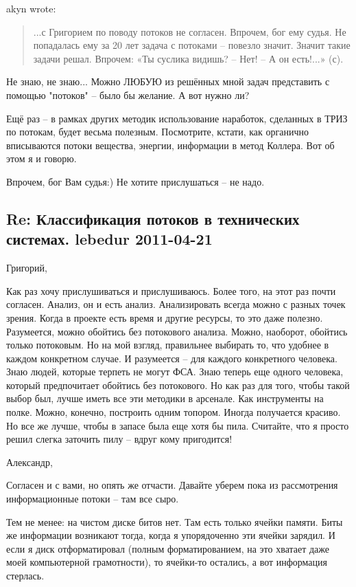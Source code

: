 \documentclass[a4paper,11pt]{article}
\begin{document}
akyn wrote:
\begin{quote}
  ...с Григорием по поводу потоков не согласен. Впрочем, бог ему судья. Не
  попадалась ему за 20 лет задача с потоками – повезло значит. Значит такие
  задачи решал. Впрочем: «Ты суслика видишь? – Нет! – А он есть!...» (с).
\end{quote}
Не знаю, не знаю...  Можно ЛЮБУЮ из решённых мной задач представить с помощью
"потоков" {--} было бы желание.  А вот нужно ли?

Ещё раз -- в рамках других методик использование наработок, сделанных в ТРИЗ
по потокам, будет весьма полезным.  Посмотрите, кстати, как органично
вписываются потоки вещества, энергии, информации в метод Коллера.  Вот об этом
я и говорю.

Впрочем, бог Вам судья:)
Не хотите прислушаться -- не надо.

\subsection*{Re: Классификация потоков в технических системах.  lebedur
  2011-04-21} 

Григорий,

Как раз хочу прислушиваться и прислушиваюсь. Более того, на этот раз почти
согласен. Анализ, он и есть анализ. Анализировать всегда можно с разных точек
зрения. Когда в проекте есть время и другие ресурсы, то это даже полезно.
Разумеется, можно обойтись без потокового анализа. Можно, наоборот, обойтись
только потоковым. Но на мой взгляд, правильнее выбирать то, что удобнее в
каждом конкретном случае. И разумеется – для каждого конкретного человека.
Знаю людей, которые терпеть не могут ФСА. Знаю теперь еще одного человека,
который предпочитает обойтись без потокового. Но как раз для того, чтобы такой
выбор был, лучше иметь все эти методики в арсенале. Как инструменты на полке.
Можно, конечно, построить одним топором. Иногда получается красиво. Но все же
лучше, чтобы в запасе была еще хотя бы пила. Считайте, что я просто решил
слегка заточить пилу – вдруг кому пригодится!

Александр,

Согласен и с вами, но опять же отчасти. Давайте уберем пока из рассмотрения
информационные потоки – там все сыро.

Тем не менее: на чистом диске битов нет. Там есть только ячейки памяти. Биты
же информации возникают тогда, когда я упорядоченно эти ячейки зарядил. И если
я диск отформатировал (полным форматированием, на это хватает даже моей
компьютерной грамотности), то ячейки-то остались, а вот информация стерлась. 
\end{document}
